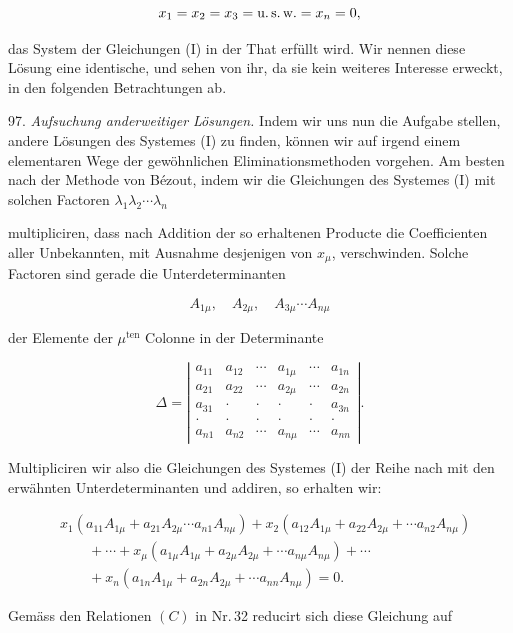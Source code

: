 \documentclass[11pt]{article}
\providecommand{\weberpage}[1]{}
\let\Delta\varDelta
\begin{document}
\[
x_1=x_2=x_3= \text{u.\,s.\,w.} =x_n=0,
\]

das System der Gleichungen (I) in der That erfüllt wird. Wir nennen diese
Lösung eine identische, und sehen von ihr, da sie kein weiteres Interesse
erweckt, in den folgenden Betrachtungen ab.

97. \textit{Aufsuchung anderweitiger Lösungen.} Indem wir uns nun die
Aufgabe stellen, andere Lösungen des Systemes (I) zu finden, können wir
auf irgend einem elementaren Wege der gewöhnlichen Eliminationsmethoden
vorgehen. Am besten nach der Methode von Bézout, indem wir die
Gleichungen des Systemes (I) mit solchen Factoren $\lambda_1\lambda_2\cdots\lambda_n$


\weberpage{102}
multipliciren, dass nach Addition der so erhaltenen Producte die
Coefficienten aller Unbekannten, mit Ausnahme desjenigen von $x_\mu$,
verschwinden. Solche Factoren sind gerade die Unterdeterminanten

\[
A_{1\mu},\quad A_{2\mu},\quad A_{3\mu}\cdots A_{n\mu}
\]

der Elemente der $\mu^{\text{ten}}$ Colonne in der Determinante

\[
\Delta=
\left|
\begin{array}{cccccc}
a_{11} & a_{12} & \cdots & a_{1\mu} & \cdots & a_{1n}\\
a_{21} & a_{22} & \cdots & a_{2\mu} & \cdots & a_{2n}\\
a_{31} & \cdot & \cdot & \cdot & \cdot & a_{3n}\\
\cdot & \cdot & \cdot & \cdot & \cdot & \cdot\\
a_{n1} & a_{n2} & \cdots & a_{n\mu} & \cdots & a_{nn}
\end{array}
\right|.
\]

Multipliciren wir also die Gleichungen des Systemes (I) der Reihe nach
mit den erwähnten Unterdeterminanten und addiren, so erhalten wir:

\[
\begin{aligned}
&x_1(a_{11}A_{1\mu}+a_{21}A_{2\mu}\cdots a_{n1}A_{n\mu})+x_2(a_{12}A_{1\mu}+a_{22}A_{2\mu}+\cdots a_{n2}A_{n\mu})\\
&\qquad+\cdots+x_\mu(a_{1\mu}A_{1\mu}+a_{2\mu}A_{2\mu}+\cdots a_{n\mu}A_{n\mu})+\cdots\\
&\qquad+x_n(a_{1n}A_{1\mu}+a_{2n}A_{2\mu}+\cdots a_{nn}A_{n\mu})=0.
\end{aligned}
\]

Gemäss den Relationen $(C)$ in Nr.\,32 reducirt sich diese Gleichung auf
\end{document}
